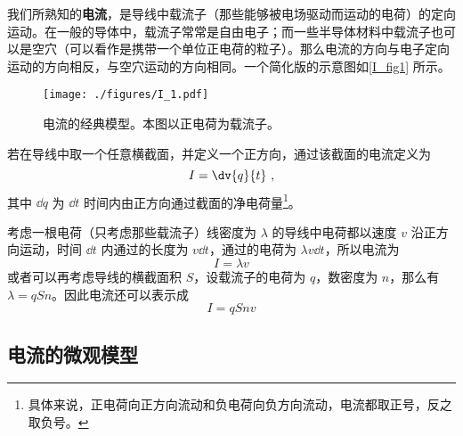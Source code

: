 
\begin{issues}
\issueDraft
\end{issues}


我们所熟知的\textbf{电流}，是导线中载流子（那些能够被电场驱动而运动的电荷）的定向运动。在一般的导体中，载流子常常是自由电子；而一些半导体材料中载流子也可以是空穴（可以看作是携带一个单位正电荷的粒子）。那么电流的方向与电子定向运动的方向相反，与空穴运动的方向相同。一个简化版的示意图如\autoref{I_fig1} 所示。
\begin{figure}[ht]
\centering
\texttt{[image: ./figures/I\_1.pdf]}
\caption{电流的经典模型。本图以正电荷为载流子。} \label{I_fig1}
\end{figure}

若在导线中取一个任意横截面，并定义一个正方向，通过该截面的电流定义为
\begin{equation}\label{I_eq1}
I = \dv{q}{t}~,
\end{equation}
其中 $\dd{q}$ 为 $\dd{t}$ 时间内由正方向通过截面的净电荷量\footnote{具体来说，正电荷向正方向流动和负电荷向负方向流动，电流都取正号，反之取负号。}。

考虑一根电荷（只考虑那些载流子）线密度为 $\lambda$ 的导线中电荷都以速度 $v$ 沿正方向运动，时间 $\dd{t}$ 内通过的长度为 $v\dd{t}$，通过的电荷为 $\lambda v\dd{t}$，所以电流为
\begin{equation}
I = \lambda v
\end{equation}
或者可以再考虑导线的横截面积 $S$，设载流子的电荷为 $q$，数密度为 $n$，那么有 $\lambda = q S n$。因此电流还可以表示成
\begin{equation}
I = q Snv
\end{equation}
\subsection{电流的微观模型}